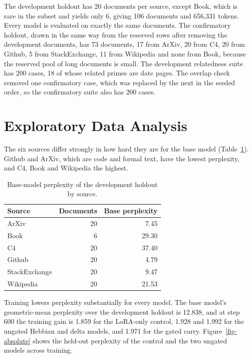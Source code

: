 \documentclass[12pt,a4paper]{report}
\begin{document}
The development holdout has 20 documents per source, except Book, which is rare in the subset and yields only 6, giving 106 documents and 656{,}331 tokens. Every model is evaluated on exactly the same documents. The confirmatory holdout, drawn in the same way from the reserved rows after removing the development documents, has 73 documents, 17 from ArXiv, 20 from C4, 20 from Github, 5 from StackExchange, 11 from Wikipedia and none from Book, because the reserved pool of long documents is small. The development relatedness suite has 200 cases, 18 of whose related primes are date pages. The overlap check removed one confirmatory case, which was replaced by the next in the seeded order, so the confirmatory suite also has 200 cases.

\section{Exploratory Data Analysis}

The six sources differ strongly in how hard they are for the base model (Table~\ref{tab-base}). Github and ArXiv, which are code and formal text, have the lowest perplexity, and C4, Book and Wikipedia the highest.

\begin{table}[H]
  \centering
  \caption{Base-model perplexity of the development holdout by source.}
  \label{tab-base}
  \small
  \begin{tabular}{lrr}
    \toprule
    Source & Documents & Base perplexity \\
    \midrule
    ArXiv & 20 & 7.45 \\
    Book & 6 & 29.30 \\
    C4 & 20 & 37.40 \\
    Github & 20 & 4.79 \\
    StackExchange & 20 & 9.47 \\
    Wikipedia & 20 & 21.53 \\
    \bottomrule
  \end{tabular}
\end{table}

Training lowers perplexity substantially for every model. The base model's geometric-mean perplexity over the development holdout is 12.838, and at step 600 the training gain is 1.859 for the LoRA-only control, 1.928 and 1.992 for the ungated Hebbian and delta models, and 1.971 for the gated carry. Figure~\ref{fig-absolute} shows the held-out perplexity of the control and the two ungated models across training.
\end{document}
